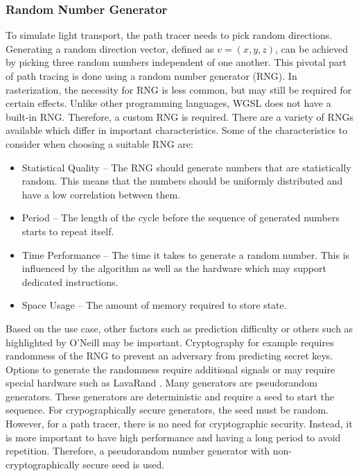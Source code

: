 \subsubsection{Random Number Generator}
  
To simulate light transport, the path tracer needs to pick random directions. Generating a random direction vector, defined as $v = (x, y, z)$, can be achieved by picking three random numbers independent of one another. This pivotal part of path tracing is done using a random number generator (\gls{RNG}). In rasterization, the necessity for \gls{RNG} is less common, but may still be required for certain effects. Unlike other programming languages, \gls{WGSL} does not have a built-in \gls{RNG}. Therefore, a custom \gls{RNG} is required. There are a variety of \gls{RNG}s available which differ in important characteristics. Some of the characteristics to consider when choosing a suitable \gls{RNG} are:

\begin{itemize}
    \item{Statistical Quality} – The \gls{RNG} should generate numbers that are statistically random. This means that the numbers should be uniformly distributed and have a low correlation between them.
    \item{Period} – The length of the cycle before the sequence of generated numbers starts to repeat itself.
    \item{Time Performance} – The time it takes to generate a random number. This is influenced by the algorithm as well as the hardware which may support dedicated instructions.
    \item{Space Usage} – The amount of memory required to store state.
\end{itemize}

Based on the use case, other factors such as prediction difficulty or others such as highlighted by O’Neill \cite{o2014pcg} may be important. Cryptography for example requires randomness of the \gls{RNG} to prevent an adversary from predicting secret keys. Options to generate the randomness require additional signals \cite{randomnessCryptography} or may require special hardware such as LavaRand \cite{cloudflareLavaRand}. Many generators are pseudorandom generators. These generators are deterministic and require a seed to start the sequence. For crypographically secure generators, the seed must be random.
However, for a path tracer, there is no need for cryptographic security. Instead, it is more important to have high performance and having a long period to avoid repetition. Therefore, a pseudorandom number generator with non-cryptographically secure seed is used.

